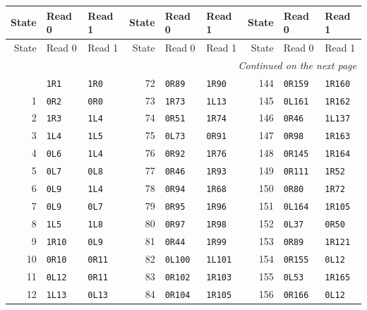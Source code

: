 \begingroup\small
\begin{longtable}{@{}rll@{\hspace{1.4em}}rll@{\hspace{1.4em}}rll@{}}
\toprule
State & Read 0 & Read 1 & State & Read 0 & Read 1 & State & Read 0 & Read 1 \\
\midrule
\endfirsthead
\toprule
State & Read 0 & Read 1 & State & Read 0 & Read 1 & State & Read 0 & Read 1 \\
\midrule
\endhead
\midrule\multicolumn{9}{r}{\emph{Continued on the next page}}\\
\endfoot
\bottomrule
\endlastfoot
0 & \texttt{1R1} & \texttt{1R0} & 72 & \texttt{0R89} & \texttt{1R90} & 144 & \texttt{0R159} & \texttt{1R160} \\
1 & \texttt{0R2} & \texttt{0R0} & 73 & \texttt{1R73} & \texttt{1L13} & 145 & \texttt{0L161} & \texttt{1R162} \\
2 & \texttt{1R3} & \texttt{1L4} & 74 & \texttt{0R51} & \texttt{1R74} & 146 & \texttt{0R46} & \texttt{1L137} \\
3 & \texttt{1L4} & \texttt{1L5} & 75 & \texttt{0L73} & \texttt{0R91} & 147 & \texttt{0R98} & \texttt{1R163} \\
4 & \texttt{0L6} & \texttt{1L4} & 76 & \texttt{0R92} & \texttt{1R76} & 148 & \texttt{0R145} & \texttt{1R164} \\
5 & \texttt{0L7} & \texttt{0L8} & 77 & \texttt{0R46} & \texttt{1R93} & 149 & \texttt{0R111} & \texttt{1R52} \\
6 & \texttt{0L9} & \texttt{1L4} & 78 & \texttt{0R94} & \texttt{1R68} & 150 & \texttt{0R80} & \texttt{1R72} \\
7 & \texttt{0L9} & \texttt{0L7} & 79 & \texttt{0R95} & \texttt{1R96} & 151 & \texttt{0L164} & \texttt{1R105} \\
8 & \texttt{1L5} & \texttt{1L8} & 80 & \texttt{0R97} & \texttt{1R98} & 152 & \texttt{0L37} & \texttt{0R50} \\
9 & \texttt{1R10} & \texttt{0L9} & 81 & \texttt{0R44} & \texttt{1R99} & 153 & \texttt{0R89} & \texttt{1R121} \\
10 & \texttt{0R10} & \texttt{0R11} & 82 & \texttt{0L100} & \texttt{1L101} & 154 & \texttt{0R155} & \texttt{0L12} \\
11 & \texttt{0L12} & \texttt{0R11} & 83 & \texttt{0R102} & \texttt{1R103} & 155 & \texttt{0L53} & \texttt{1R165} \\
12 & \texttt{1L13} & \texttt{0L13} & 84 & \texttt{0R104} & \texttt{1R105} & 156 & \texttt{0R166} & \texttt{0L12} \\

\end{longtable}
